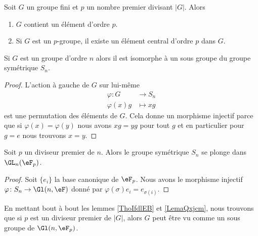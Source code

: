 \begin{theorem}       \label{ThoCauchyGpFini}
    Soit \( G\) un groupe fini et \( p\) un nombre premier divisant \( | G |\). Alors 
    \begin{enumerate}
        \item
            \( G\) contient un élément d'ordre \( p\).
        \item
            Si \( G\) est un \( p\)-groupe, il existe un élément central d'ordre \( p\) dans \( G\).
    \end{enumerate}
\end{theorem}

\begin{lemma}    \label{ThoIfdlEB}   
    Si \( G\) est un groupe d'ordre \( n\) alors il est isomorphe à un sous groupe du groupe symétrique \( S_n\).
\end{lemma}

\begin{proof}
    L'action à gauche de \( G\) sur lui-même
    \begin{equation}
        \begin{aligned}
            \varphi\colon G&\to S_n \\
            \varphi(x)g&\mapsto xg 
        \end{aligned}
    \end{equation}
    est une permutation des éléments de \( G\). Cela donne un morphisme injectif parce que si \( \varphi(x)=\varphi(y)\) nous avons \( xg=yg\) pour tout \( g\) et en particulier pour \( g=e\) nous trouvons \( x=y\).
\end{proof}

\begin{lemma}       \label{LemaQxjcm}
    Soit \( p\) un diviseur premier de \( n\). Alors le groupe symétrique \( S_n\) se plonge dans \( \GL_n(\eF_p)\).
\end{lemma}

\begin{proof}
    Soit \( \{ e_i \}\) la base canonique de \( \eF_p\). Nous avons le morphisme injectif $\varphi\colon S_n\to \Gl(n,\eF)$ donné par \( \varphi(\sigma)e_i=e_{\sigma(i)}\).
\end{proof}
 
\begin{remark}  \label{RemFzxxst}
    En mettant bout à bout les lemmes \ref{ThoIfdlEB} et \ref{LemaQxjcm}, nous trouvons que si \( p\) est un diviseur premier de \( | G |\), alors \( G\) peut être vu comme un sous groupe de \( \Gl(n,\eF_p)\).
\end{remark}

